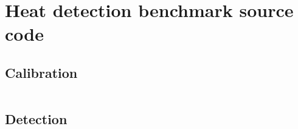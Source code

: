 \chapter{Heat detection benchmark source code}
\label{app-heat-detection-source}

\section{Calibration}
\inputminted[breaklines=true]{java}{C01-code-heat-calib.java}

\section{Detection}
\inputminted[breaklines=true]{java}{C02-code-heat-detect.java}
